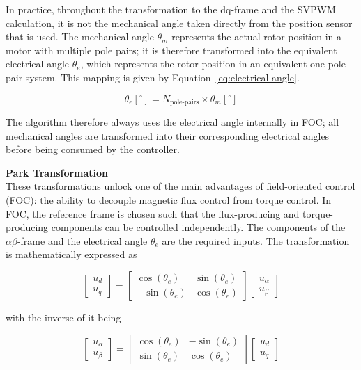 In practice, throughout the transformation to the dq-frame and the SVPWM calculation, it is not the mechanical angle taken directly from the position sensor that is used. The mechanical angle $\theta_m$ represents the actual rotor position in a motor with multiple pole pairs; it is therefore transformed into the equivalent electrical angle $\theta_e$, which represents the rotor position in an equivalent one-pole-pair system. This mapping is given by Equation~\ref{eq:electrical-angle}.

\begin{equation}
    \theta_e [^\circ] = N_{\text{pole-pairs}} \times \theta_m [^\circ]
    \label{eq:electrical-angle}
\end{equation}

The algorithm therefore always uses the electrical angle internally in FOC; all mechanical angles are transformed into their corresponding electrical angles before being consumed by the controller.

\textbf{Park Transformation} \\
These transformations unlock one of the main advantages of field-oriented control (FOC): the ability to decouple magnetic flux control from torque control. In FOC, the reference frame is chosen such that the flux-producing and torque-producing components can be controlled independently. The components of the $\alpha\beta$-frame and the electrical angle $\theta_e$ are the required inputs. The transformation is mathematically expressed as

\begin{equation}
    \begin{bmatrix} u_d \\ u_q \end{bmatrix}
    =
    \begin{bmatrix} \cos(\theta_e) & \sin(\theta_e) \\ -\sin(\theta_e) & \cos(\theta_e) \end{bmatrix}
    \begin{bmatrix} u_\alpha \\ u_\beta \end{bmatrix}
    \label{eq:park-matrix}
\end{equation}

with the inverse of it being

\begin{equation}
    \begin{bmatrix} u_\alpha \\ u_\beta \end{bmatrix}
    =
    \begin{bmatrix} \cos(\theta_e) & -\sin(\theta_e) \\ \sin(\theta_e) & \cos(\theta_e) \end{bmatrix}
    \begin{bmatrix} u_d \\ u_q \end{bmatrix}
    \label{eq:park-inverse-matrix}
\end{equation}


